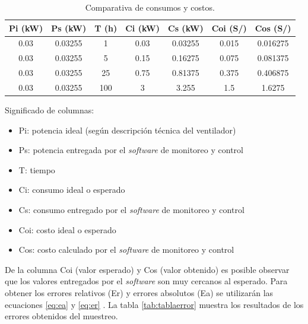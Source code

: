 \begin{table}[h]
	\centering
	\caption[Comparativa de consumos y costos]{Comparativa de consumos y costos.}
	\begin{tabular}{c c c c c c c}    
		\toprule
		\textbf{Pi (kW)} 	 & \textbf{Ps (kW)}  & \textbf{T (h)} &\textbf{Ci (kW)} &\textbf{Cs (kW)} &\textbf{Coi (S/)} &\textbf{Cos (S/)}\\
		\midrule
		0.03 & 0.03255 & 1 & 0.03 & 0.03255 & 0.015 & 0.016275\\		
		0.03 & 0.03255 & 5 & 0.15 & 0.16275 & 0.075 & 0.081375 \\
		0.03 & 0.03255 & 25 & 0.75 & 0.81375 & 0.375 & 0.406875\\		
		0.03 & 0.03255 & 100 & 3 & 3.255 & 1.5 & 1.6275\\		
		
		\bottomrule
		\hline
	\end{tabular}
	\label{tab:tablacostos}
\end{table}

\vspace{0.1cm}
Significado de columnas:
\begin{itemize}
\item Pi: potencia ideal (según descripción técnica del ventilador) 
\item Ps: potencia entregada por el \emph{software} de monitoreo y control
\item T: tiempo
\item Ci: consumo ideal o esperado
\item Cs: consumo entregado por el \emph{software} de monitoreo y control
\item Coi: costo ideal o esperado
\item Cos: costo calculado por el \emph{software} de monitoreo y control
\end{itemize}

\vspace{0.1cm}
De la columna Coi (valor esperado) y Cos (valor obtenido) es posible observar que los valores entregados por el \emph{software} son muy cercanos al esperado. Para obtener los errores relativos (Er) y errores absolutos (Ea) se utilizarán las ecuaciones  \ref{eq:ea} y \ref{eq:er} . La tabla \ref{tab:tablaerror} muestra los resultados de los errores obtenidos del muestreo.




